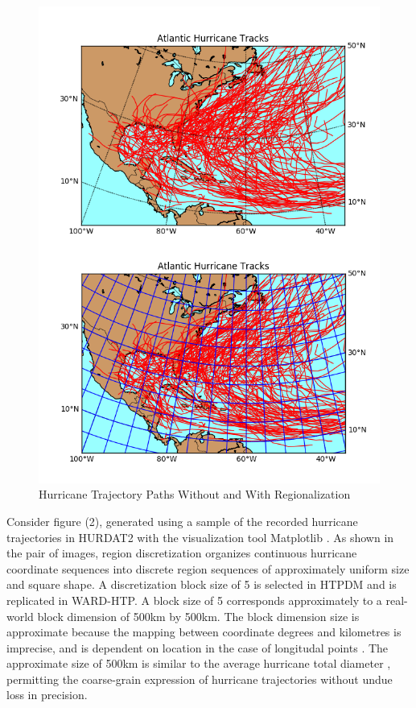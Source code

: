 \documentclass[12pt,conference]{IEEEtran}
\begin{document}
\begin{figure}[htp]
\caption{Hurricane Trajectory Paths Without and With Regionalization}
\centering
\includegraphics[scale=0.55]{Merged-Trajectory-Comparison}
\end{figure}

Consider figure (2), generated using a sample of the recorded hurricane trajectories in HURDAT2 with the visualization tool Matplotlib \cite{matplotlib}. As shown in the pair of images, region discretization organizes continuous hurricane coordinate sequences into discrete region sequences of approximately uniform size and square shape. A discretization block size of 5 is selected in HTPDM and is replicated in WARD-HTP. A block size of 5 corresponds approximately to a real-world block dimension of 500km by 500km. The block dimension size is approximate because the mapping between coordinate degrees and kilometres is imprecise, and is dependent on location in the case of longitudal points \cite{lat-long-distance}. The approximate size of 500km is similar to the average hurricane total diameter \cite{hurricane-distances}, permitting the coarse-grain expression of hurricane trajectories without undue loss in precision.
\end{document}
